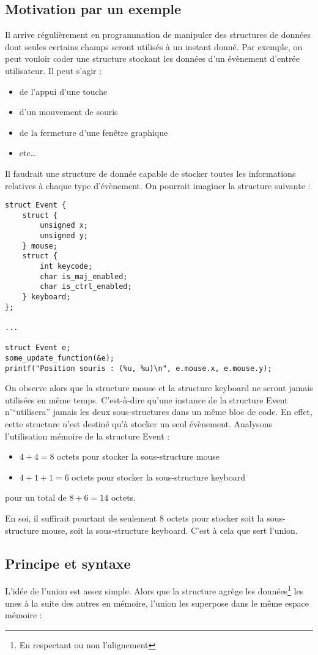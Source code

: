 \documentclass[../../../main.tex]{subfiles}
\begin{document}
\subsection{Motivation par un exemple}
Il arrive régulièrement en programmation de manipuler des structures de données dont seules certains
champs seront utilisés à un instant donné. Par exemple, on peut vouloir coder une structure stockant
les données d’un évènement d’entrée utilisateur. Il peut s’agir :
\begin{itemize}
	\item de l’appui d’une touche
	\item d’un mouvement de souris
	\item de la fermeture d’une fenêtre graphique
	\item etc\dots
\end{itemize}
Il faudrait une structure de donnée capable de stocker toutes les informations relatives à chaque type
d’évènement. On pourrait imaginer la structure suivante :
\begin{verbatim}
struct Event {
	struct {
		unsigned x;
		unsigned y;
	} mouse;
	struct {
		int keycode;
		char is_maj_enabled;
		char is_ctrl_enabled;
	} keyboard;
};

...

struct Event e;
some_update_function(&e);
printf("Position souris : (%u, %u)\n", e.mouse.x, e.mouse.y);
\end{verbatim}
On observe alors que la structure \textsf{mouse} et la structure \textsf{keyboard} ne seront jamais utilisées en même
temps. C’est-à-dire qu’une instance de la structure Event n’``utilisera'' jamais les deux sous-structures
dans un même bloc de code. En effet, cette structure n’est destiné qu’à stocker un seul évènement.
Analysons l’utilisation mémoire de la structure \textsf{Event} :
\begin{itemize}
	\item $4 + 4 = 8$ octets pour stocker la sous-structure \textsf{mouse}
	\item $4 + 1 + 1 = 6$ octets pour stocker la sous-structure \textsf{keyboard}
\end{itemize}
pour un total de $8 + 6 = 14$ octets.

En soi, il suffirait pourtant de seulement 8 octets pour stocker soit la sous-structure \textsf{mouse}, soit la
sous-structure \textsf{keyboard}. C’est à cela que sert l’union.
\subsection{Principe et syntaxe}
L’idée de l’union est assez simple. Alors que la structure agrège les données\footnote{En respectant ou non l’alignement} les unes à la suite des autres en mémoire, l’union les superpose dans le même espace mémoire :
\end{document}
